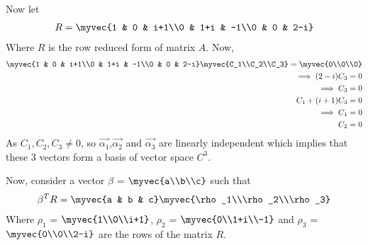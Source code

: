 \documentclass[journal,12pt,twocolumn]{IEEEtran}
\begin{document}
Now let 
\begin{align}
R = \myvec{1 & 0 & i+1\\0 & 1+i & -1\\0 & 0 & 2-i}
\end{align}
Where $R$ is the row reduced form of matrix $A$.
Now, 
\begin{align}
\myvec{1 & 0 & i+1\\0 & 1+i & -1\\0 & 0 & 2-i}\myvec{C_1\\C_2\\C_3} = \myvec{0\\0\\0}\\
\implies (2-i)C_3 = 0\\
\implies C_3 = 0\\
C_1 + (i+1)C_3 = 0\\
\implies C_1 = 0\\
C_2 = 0
\end{align}
As $C_1,C_2,C_3 \neq 0$, so $\vec{\alpha_1}$,$\vec{\alpha_2}$ and $\vec{\alpha_3}$ are linearly independent which implies that these 3 vectors form a basis of vector space $C^3$.

Now, consider a vector $\beta$ = $\myvec{a\\b\\c}$ such that
\begin{align}
\beta^T R = \myvec{a & b & c}\myvec{\rho_1\\\rho_2\\\rho_3}
\end{align}
Where $\rho_1$ = $\myvec{1\\0\\i+1}$, $\rho_2$ = $\myvec{0\\1+i\\-1}$ and $\rho_3$ = $\myvec{0\\0\\2-i}$ are the rows of the matrix $R$.
\end{document}
